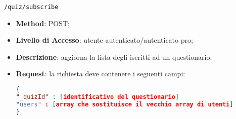 	\item \texttt{/quiz/subscribe}
		\begin{itemize}
			\item \textbf{Method}: POST;
			\item \textbf{Livello di Accesso}: utente autenticato/autenticato pro;
			\item \textbf{Descrizione}: aggiorna la lista degli iscritti ad un questionario;
			\item \textbf{Request}: la richiesta deve contenere i seguenti campi:
\begin{lstlisting}[language=json,firstnumber=1]
{
"_quizId" : [identificativo del questionario]
"users" : [array che sostituisce il vecchio array di utenti]
}
\end{lstlisting}
		\end{itemize}
